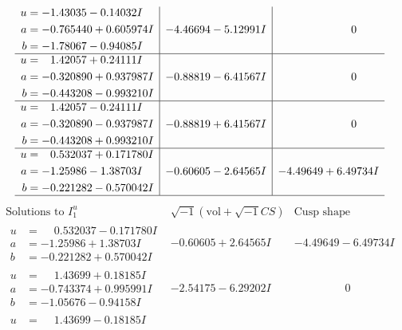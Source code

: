 \documentclass[1p]{elsarticle_modified}
\theoremstyle{definition}
\newcommand{\I}{\sqrt{-1}}
\begin{document}
$$\begin{array}{c|c|c}
\begin{aligned}
u &= -1.43035 - 0.14032 I \\
a &= -0.765440 + 0.605974 I \\
b &= -1.78067 - 0.94085 I\end{aligned}
 & -4.46694 - 5.12991 I & \phantom{-0.000000 } 0 \\ \hline\begin{aligned}
u &= \phantom{-}1.42057 + 0.24111 I \\
a &= -0.320890 + 0.937987 I \\
b &= -0.443208 - 0.993210 I\end{aligned}
 & -0.88819 - 6.41567 I & \phantom{-0.000000 } 0 \\ \hline\begin{aligned}
u &= \phantom{-}1.42057 - 0.24111 I \\
a &= -0.320890 - 0.937987 I \\
b &= -0.443208 + 0.993210 I\end{aligned}
 & -0.88819 + 6.41567 I & \phantom{-0.000000 } 0 \\ \hline\begin{aligned}
u &= \phantom{-}0.532037 + 0.171780 I \\
a &= -1.25986 - 1.38703 I \\
b &= -0.221282 - 0.570042 I\end{aligned}
 & -0.60605 - 2.64565 I & -4.49649 + 6.49734 I\\
 \hline 
 \end{array}$$\newpage$$\begin{array}{c|c|c}  
\text{Solutions to }I^u_{1}& \I (\text{vol} + \sqrt{-1}CS) & \text{Cusp shape}\\
 \hline 
\begin{aligned}
u &= \phantom{-}0.532037 - 0.171780 I \\
a &= -1.25986 + 1.38703 I \\
b &= -0.221282 + 0.570042 I\end{aligned}
 & -0.60605 + 2.64565 I & -4.49649 - 6.49734 I \\ \hline\begin{aligned}
u &= \phantom{-}1.43699 + 0.18185 I \\
a &= -0.743374 + 0.995991 I \\
b &= -1.05676 - 0.94158 I\end{aligned}
 & -2.54175 - 6.29202 I & \phantom{-0.000000 } 0 \\ \hline\begin{aligned}
u &= \phantom{-}1.43699 - 0.18185 I \\

\end{aligned}
\end{array}$$
\end{document}
